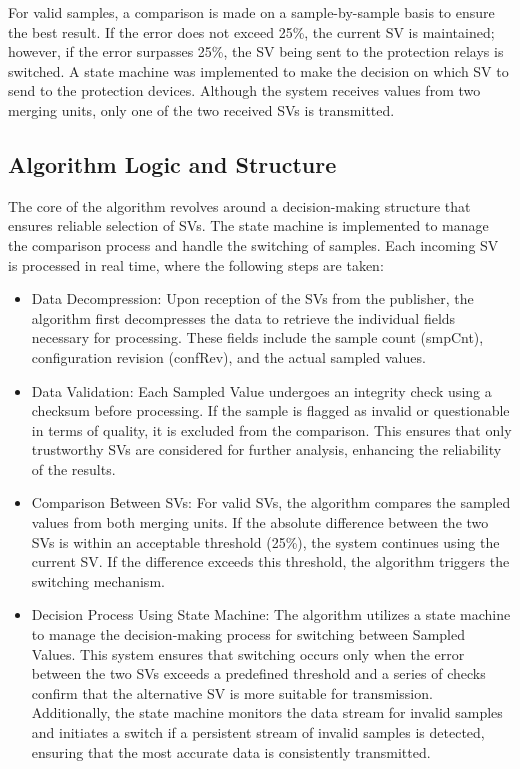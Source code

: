 For valid samples, a comparison is made on a sample-by-sample basis to ensure the best result. If the error does not exceed 25\%, the current SV is maintained; however, if the error surpasses 25\%, the SV being sent to the protection relays is switched. A state machine was implemented to make the decision on which SV to send to the protection devices. Although the system receives values from two merging units, only one of the two received SVs is transmitted.

\subsection{Algorithm Logic and Structure}

The core of the algorithm revolves around a decision-making structure that ensures reliable selection of SVs. The state machine is implemented to manage the comparison process and handle the switching of samples. Each incoming SV is processed in real time, where the following steps are taken:

\begin{itemize}
	\item Data Decompression: Upon reception of the SVs from the publisher, the algorithm first decompresses the data to retrieve the individual fields necessary for processing. These fields include the sample count (smpCnt), configuration revision (confRev), and the actual sampled values.
	\item Data Validation: Each Sampled Value undergoes an integrity check using a checksum before processing. If the sample is flagged as invalid or questionable in terms of quality, it is excluded from the comparison. This ensures that only trustworthy SVs are considered for further analysis, enhancing the reliability of the results.
	\item Comparison Between SVs: For valid SVs, the algorithm compares the sampled values from both merging units. If the absolute difference between the two SVs is within an acceptable threshold (25\%), the system continues using the current SV. If the difference exceeds this threshold, the algorithm triggers the switching mechanism.	
	\item Decision Process Using State Machine: The algorithm utilizes a state machine to manage the decision-making process for switching between Sampled Values. This system ensures that switching occurs only when the error between the two SVs exceeds a predefined threshold and a series of checks confirm that the alternative SV is more suitable for transmission. Additionally, the state machine monitors the data stream for invalid samples and initiates a switch if a persistent stream of invalid samples is detected, ensuring that the most accurate data is consistently transmitted.
\end{itemize}


